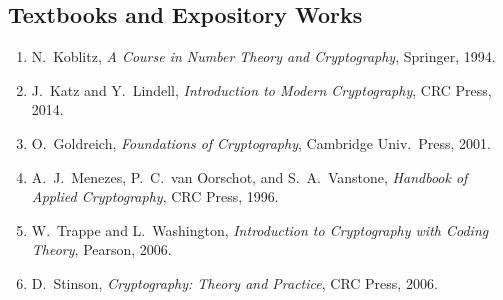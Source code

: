 \subsection*{Textbooks and Expository Works}
\begin{enumerate}
    \item N.\ Koblitz, \textit{A Course in Number Theory and Cryptography}, Springer, 1994.
    \item J.\ Katz and Y.\ Lindell, \textit{Introduction to Modern Cryptography}, CRC Press, 2014.
    \item O.\ Goldreich, \textit{Foundations of Cryptography}, Cambridge Univ.\ Press, 2001.
    \item A.\ J.\ Menezes, P.\ C.\ van Oorschot, and S.\ A.\ Vanstone, \textit{Handbook of Applied Cryptography}, CRC Press, 1996.
    \item W.\ Trappe and L.\ Washington, \textit{Introduction to Cryptography with Coding Theory}, Pearson, 2006.
    \item D.\ Stinson, \textit{Cryptography: Theory and Practice}, CRC Press, 2006.
\end{enumerate}

